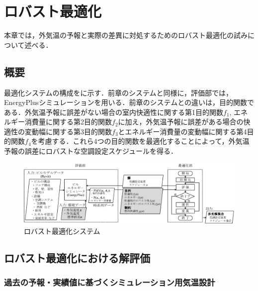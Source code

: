 \chapter{ロバスト最適化}
\label{chap::robust}

\hspace{1zw}本章では，外気温の予報と実際の差異に対処するためのロバスト最適化の試みについて述べる．

\section{概要}
最適化システムの構成をに示す．前章のシステムと同様に，評価部では，EnergyPlusシミュレーションを用いる．前章のシステムとの違いは，目的関数である．外気温予報に誤差がない場合の室内快適性に関する第1目的関数$f_1$, エネルギー消費量に関する第2目的関数$f_2$に加え，外気温予報に誤差がある場合の快適性の変動幅に関する第3目的関数$f_3$とエネルギー消費量の変動幅に関する第4目的関数$f_4$を考慮する．これら4つの目的関数を最適化することによって，外気温予報の誤差にロバストな空調設定スケジュールを得る．

\begin{figure}[t]
    \begin{center}
        \includegraphics[width=1.1\linewidth]{fig/robust_system.eps}
    \end{center}
    \caption{ロバスト最適化システム}
    \label{fig::robust_system}
\end{figure}

\section{ロバスト最適化における解評価}
\subsection{過去の予報・実績値に基づくシミュレーション用気温設計}\label{subsec::robust_airtemp}
